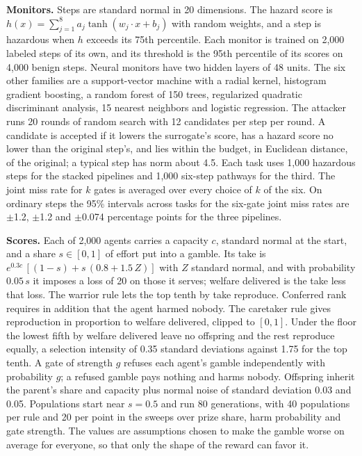\documentclass[10pt,twocolumn,letterpaper]{article}
\theoremstyle{definition}
\newcommand{\para}[1]{\smallskip\noindent\textbf{#1}\enspace}
\newcommand{\MonSameCI}{1.2}
\newcommand{\MonMixedCI}{1.2}
\newcommand{\MonDistCI}{0.074}
\begin{document}
\para{Monitors.} Steps are standard normal in 20 dimensions. The hazard score is $h(x)=\sum_{j=1}^{8}a_{j}\tanh(w_{j}\cdot x+b_{j})$ with random weights, and a step is hazardous when $h$ exceeds its 75th percentile. Each monitor is trained on 2,000 labeled steps of its own, and its threshold is the 95th percentile of its scores on 4,000 benign steps. Neural monitors have two hidden layers of 48 units. The six other families are a support-vector machine with a radial kernel, histogram gradient boosting, a random forest of 150 trees, regularized quadratic discriminant analysis, 15 nearest neighbors and logistic regression. The attacker runs 20 rounds of random search with 12 candidates per step per round. A candidate is accepted if it lowers the surrogate's score, has a hazard score no lower than the original step's, and lies within the budget, in Euclidean distance, of the original; a typical step has norm about 4.5. Each task uses 1,000 hazardous steps for the stacked pipelines and 1,000 six-step pathways for the third. The joint miss rate for $k$ gates is averaged over every choice of $k$ of the six. On ordinary steps the 95\% intervals across tasks for the six-gate joint miss rates are $\pm$\MonSameCI, $\pm$\MonMixedCI{} and $\pm$\MonDistCI{} percentage points for the three pipelines.

\para{Scores.} Each of 2{,}000 agents carries a capacity $c$, standard normal at the start, and a share $s\in[0,1]$ of effort put into a gamble. Its take is $e^{0.3c}\,[(1-s)+s\,(0.8+1.5\,Z)]$ with $Z$ standard normal, and with probability $0.05\,s$ it imposes a loss of 20 on those it serves; welfare delivered is the take less that loss. The warrior rule lets the top tenth by take reproduce. Conferred rank requires in addition that the agent harmed nobody. The caretaker rule gives reproduction in proportion to welfare delivered, clipped to $[0,1]$. Under the floor the lowest fifth by welfare delivered leave no offspring and the rest reproduce equally, a selection intensity of 0.35 standard deviations against 1.75 for the top tenth. A gate of strength $g$ refuses each agent's gamble independently with probability $g$; a refused gamble pays nothing and harms nobody. Offspring inherit the parent's share and capacity plus normal noise of standard deviation 0.03 and 0.05. Populations start near $s=0.5$ and run 80 generations, with 40 populations per rule and 20 per point in the sweeps over prize share, harm probability and gate strength. The values are assumptions chosen to make the gamble worse on average for everyone, so that only the shape of the reward can favor it.
\end{document}
